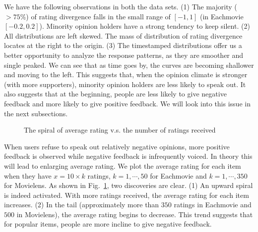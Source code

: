 \documentclass[sigconf]{acmart}
\begin{document}
We have the following observations in both the data sets. (1) The majority ($>75\%$) of rating divergence falls in the small range of $[-1,1]$ (in Eachmovie $[-0.2,0.2]$). Minority opinion holders have a strong tendency to keep silent. (2) All distributions are left skewed. The mass of distribution of rating divergence locates at the right to the origin. (3) The timestamped distributions offer us a better opportunity to analyze the response patterns, as they are smoother and single peaked. We can see that as time goes by, the curves are becoming shallower and moving to the left. This suggests that, when the opinion climate is stronger (with more supporters), minority opinion holders are less likely to speak out. It also suggests that at the beginning, people are less likely to give negative feedback and more likely to give positive feedback. We will look into this issue in the next subsections.

\begin{figure}[htbp]
\centering
\centering
{}
\caption{The spiral of average rating v.s. the number of ratings received}\label{fig:spiral}
\end{figure}

When users refuse to speak out relatively negative opinions, more positive feedback is observed while negative feedback is infrequently voiced. In theory this will lead to enlarging average rating. We plot the average rating for each item when they have $x=10\times k$ ratings, $k=1,\cdots,50$ for Eachmovie and $k=1,\cdots,350$ for Movielens. As shown in Fig.~\ref{fig:spiral}, two discoveries are clear. (1) An upward spiral is indeed activated. With more ratings received, the average rating for each item  increases. (2) In the tail (approximately more than $350$ ratings in Eachmovie and $500$ in Movielens), the average rating begins to decrease. This trend suggests that for popular items,  people are more incline to give negative feedback.
\end{document}
